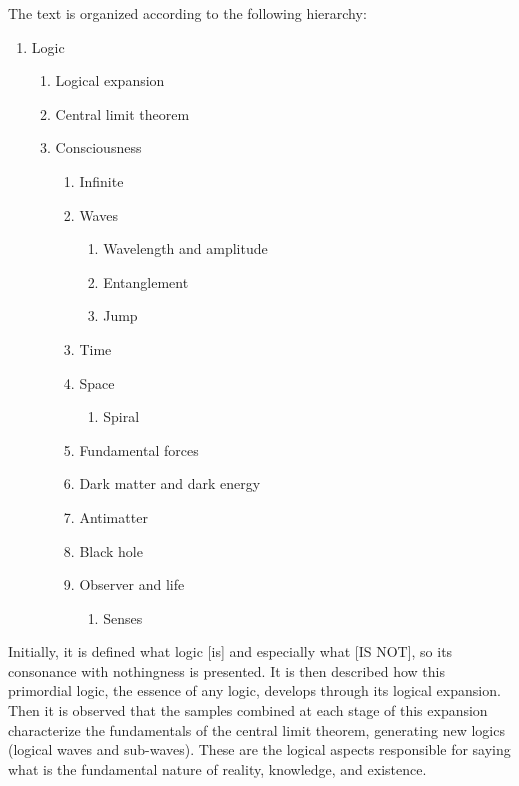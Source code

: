 \noindent The text is organized according to the following hierarchy:
	\begin{enumerate}[label*=\arabic*.]
	   \item Logic
	   \begin{enumerate}[label*=\arabic*.]
		   \item Logical expansion
		   \item Central limit theorem
		   \item Consciousness
			   \begin{enumerate}[label*=\arabic*.]
				   \item Infinite
				   \item Waves 
				   \begin{enumerate}[label*=\arabic*.]
				   		\item Wavelength and amplitude
				   		\item Entanglement
				   		\item Jump
				   \end{enumerate}  
				   \item Time
				   \item Space
				   \begin{enumerate}[label*=\arabic*.]
				   		\item Spiral
				   \end{enumerate} 
				   \item Fundamental forces
				   \item Dark matter and dark energy
				   \item Antimatter
				   \item Black hole
				   \item Observer and life
				   \begin{enumerate}[label*=\arabic*.]
				   		\item Senses
				   \end{enumerate}  
			   \end{enumerate}   
	   \end{enumerate}
	\end{enumerate}

Initially, it is defined what logic [is] and especially what [IS NOT], so its consonance with nothingness is presented. It is then described how this primordial logic, the essence of any logic, develops through its logical expansion. Then it is observed that the samples combined at each stage of this expansion characterize the fundamentals of the central limit theorem, generating new logics (logical waves and sub-waves). These are the logical aspects responsible for saying what is the fundamental nature of reality, knowledge, and existence. 

\bigbreak